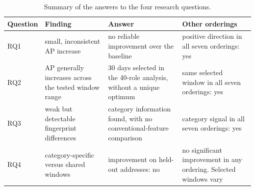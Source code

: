 \begin{table}[ht]
\centering
\caption{Summary of the answers to the four research questions.}
\label{tab:res_hypothesis}
\footnotesize
\begin{tabular}{@{}l p{3.6cm} p{4.0cm} p{4.0cm}@{}}
\toprule
\textbf{Question} & \textbf{Finding} & \textbf{Answer} & \textbf{Other orderings} \\
\midrule
RQ1 & small, inconsistent AP increase & no reliable improvement over the baseline & positive direction in all seven orderings: yes \\
RQ2 & AP generally increases across the tested window range & 30 days selected in the 40-role analysis, without a unique optimum & same selected window in all seven orderings: yes \\
RQ3 & weak but detectable fingerprint differences & category information found, with no conventional-feature comparison & category signal in all seven orderings: yes \\
RQ4 & category-specific versus shared windows & improvement on held-out addresses: no & no significant improvement in any ordering. Selected windows vary \\
\bottomrule
\end{tabular}
\end{table}
